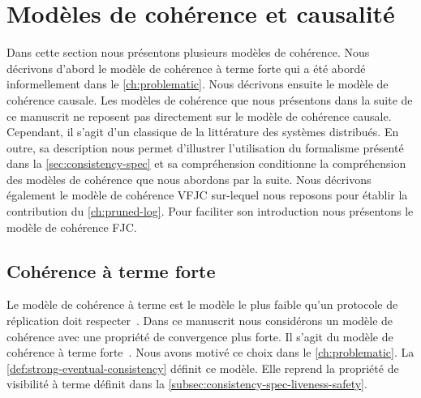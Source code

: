 \section{Modèles de cohérence et causalité}\label{sec:causal-models}

Dans cette section nous présentons plusieurs modèles de cohérence.
Nous décrivons d'abord le modèle de cohérence à terme forte qui a été abordé informellement dans le \autoref{ch:problematic}.
Nous décrivons ensuite le modèle de cohérence causale.
Les modèles de cohérence que nous présentons dans la suite de ce manuscrit ne reposent pas directement sur le modèle de cohérence causale.
Cependant, il s'agit d'un classique de la littérature des systèmes distribués.
En outre, sa description nous permet d'illustrer l'utilisation du formalisme présenté dans la \autoref{sec:consistency-spec} et sa compréhension conditionne la compréhension des modèles de cohérence que nous abordons par la suite.
Nous décrivons également le modèle de cohérence \acf{VFJC} sur-lequel nous reposons pour établir la contribution du \autoref{ch:pruned-log}.
Pour faciliter son introduction nous présentons le modèle de cohérence \acf{FJC}.

\subsection{Cohérence à terme forte}\label{subsec:strong-eventual-consistency}

Le modèle de cohérence à terme est le modèle le plus faible qu'un protocole de réplication doit respecter~\autocite{saito_2005_optimisticreplication,burckhardt_eventualconsistency_2014}.
Dans ce manuscrit nous considérons un modèle de cohérence avec une propriété de convergence plus forte.
Il s'agit du modèle de cohérence à terme forte~\autocite{shapiro_2011_crdt,burckhardt_eventualconsistency_2014}.
Nous avons motivé ce choix dans le \autoref{ch:problematic}.
La \autoref{def:strong-eventual-consistency} définit ce modèle.
Elle reprend la propriété de visibilité à terme définit dans la \autoref{subsec:consistency-spec-liveness-safety}.

